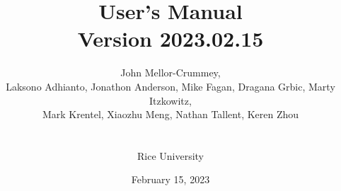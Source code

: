 \documentclass[11pt,twoside,letterpaper]{report}
\begin{document}

\title{\HPCToolkit{} User's Manual\\[.5in]Version 2023.02.15}

\author{John Mellor-Crummey,\\
Laksono Adhianto,
Jonathon Anderson,
Mike Fagan,
Dragana Grbic,
Marty Itzkowitz,\\
Mark Krentel,
Xiaozhu Meng,
Nathan Tallent,
Keren Zhou\\
\\
\\
Rice University\\
}

\date{February 15, 2023}

\maketitle



\setcounter{page}{1}






\
\begin{singlespace}


\pagestyle{empty}
\thispagestyle{empty}
\tableofcontents



\end{singlespace}
\end{document}
